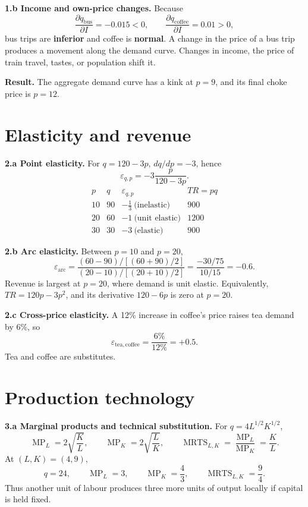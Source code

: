 \documentclass[11pt,a4paper]{article}
\newcommand{\MRTS}{\operatorname{MRTS}}
\newcommand{\MPL}{\operatorname{MP}_{L}}
\newcommand{\MPK}{\operatorname{MP}_{K}}
\begin{document}
\textbf{1.b Income and own-price changes.} Because
\[
\frac{\partial q_{\mathrm{bus}}}{\partial I}=-0.015<0,\qquad
\frac{\partial q_{\mathrm{coffee}}}{\partial I}=0.01>0,
\]
bus trips are \textbf{inferior} and coffee is \textbf{normal}. A change in the
price of a bus trip produces a movement along the demand curve. Changes in
income, the price of train travel, tastes, or population shift it.

\begin{solutionbox}
\textbf{Result.} The aggregate demand curve has a kink at \(p=9\), and its
final choke price is \(p=12\).
\end{solutionbox}

\section{Elasticity and revenue}

\textbf{2.a Point elasticity.} For \(q=120-3p\), \(dq/dp=-3\), hence
\[
\varepsilon_{q,p}=-3\frac{p}{120-3p}.
\]
\[
\begin{array}{c|c|c|c}
p&q&\varepsilon_{q,p}&TR=pq\\ \hline
10&90&-\frac13\ \text{(inelastic)}&900\\
20&60&-1\ \text{(unit elastic)}&1200\\
30&30&-3\ \text{(elastic)}&900
\end{array}
\]

\textbf{2.b Arc elasticity.} Between \(p=10\) and \(p=20\),
\[
\varepsilon_{\mathrm{arc}}
=\frac{(60-90)/[(60+90)/2]}{(20-10)/[(20+10)/2]}
=\frac{-30/75}{10/15}=\boxed{-0.6}.
\]
Revenue is largest at \(p=20\), where demand is unit elastic. Equivalently,
\(TR=120p-3p^2\), and its derivative \(120-6p\) is zero at \(p=20\).

\textbf{2.c Cross-price elasticity.} A 12\% increase in coffee's price raises
tea demand by 6\%, so
\[
\varepsilon_{\mathrm{tea,coffee}}=\frac{6\%}{12\%}=\boxed{+0.5}.
\]
Tea and coffee are substitutes.

\section{Production technology}

\textbf{3.a Marginal products and technical substitution.} For
\(q=4L^{1/2}K^{1/2}\),
\[
\MPL=2\sqrt{\frac{K}{L}},\qquad
\MPK=2\sqrt{\frac{L}{K}},\qquad
\MRTS_{L,K}=\frac{\MPL}{\MPK}=\frac{K}{L}.
\]
At \((L,K)=(4,9)\),
\[
q=\boxed{24},\qquad \MPL=\boxed{3},\qquad
\MPK=\boxed{\frac43},\qquad \MRTS_{L,K}=\boxed{\frac94}.
\]
Thus another unit of labour produces three more units of output locally if
capital is held fixed.
\end{document}
